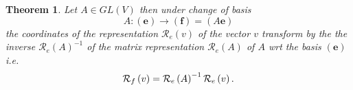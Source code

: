 \documentclass[aps,preprint]{revtex4}
\newtheorem{theorem}{Theorem}
\begin{document}
\begin{theorem}
\label{Contravariant Theorem} Let $A\in GL\left( V\right) $ then under
change of basis 
\begin{equation}
A:\left( \boldsymbol{e}\right) \rightarrow \left( \boldsymbol{f}\right)
=\left( A\boldsymbol{e}\right)
\end{equation}%
the coordinates of the representation $\mathcal{R}_{e}\left( v\right) $ of
the vector $v$ transform by the the inverse $\mathcal{R}_{e}\left( A\right)
^{-1}$ of the matrix representation $\mathcal{R}_{e}\left( A\right) $ of $A$
wrt the basis $\left( \boldsymbol{e}\right) $ i.e. 
\begin{equation}
\mathcal{R}_{f}\left( v\right) =\mathcal{R}_{e}\left( A\right) ^{-1}\mathcal{%
R}_{e}\left( v\right) .
\end{equation}


\end{theorem}
\end{document}
